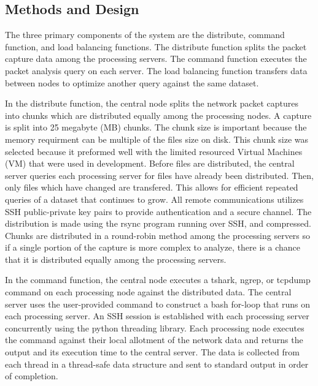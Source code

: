 \documentclass{article}
\begin{document}
\begin{multicols}{2}
\section*{Methods and Design}

The three primary components of the system are the distribute, command function, and load balancing functions. The distribute function splits the packet capture data among the processing servers. The command function executes the packet analysis query on each server.  The load balancing function transfers data between nodes to optimize another query against the same dataset.

In the distribute function,  the central node splits the network packet captures into chunks which are distributed equally among the processing nodes.  A capture is split into 25 megabyte (MB) chunks. The chunk size is important because the memory requirment can be multiple of the files size on disk. This chunk size was selected because it preformed well with the limited resourced Virtual Machines (VM) that were used in development.  Before files are distributed, the central server queries each processing server for files have already been distributed. Then, only files which have changed are transfered.  This allows for efficient repeated queries of a dataset that continues to grow.  All remote communications utilizes SSH public-private key pairs to provide authentication and a secure channel.  The distribution is made using the rsync program running over SSH, and compressed.  Chunks are distributed in a round-robin method among the processing servers so if a single portion of the capture is more complex to analyze, there is a chance that it is distributed equally among the processing servers.      

In the command function, the central node executes a tshark, ngrep, or tcpdump command on each processing node against the distributed data. The central server uses the user-provided command to construct a bash for-loop that runs on each processing server. An SSH session is established with each processing server concurrently using the python threading library.  Each processing node executes the command against their local allotment of the network data and returns the output and its execution time to the central server. The data is collected from each thread in a thread-safe data structure and sent to standard output in order of completion.


\end{multicols}
\end{document}
